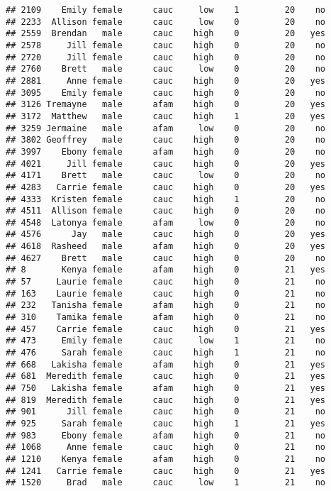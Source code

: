\documentclass[
]{article}
\begin{document}
\begin{verbatim}
## 2109    Emily female      cauc     low    1         20    no
## 2233  Allison female      cauc     low    0         20    no
## 2559  Brendan   male      cauc    high    0         20   yes
## 2578     Jill female      cauc    high    0         20    no
## 2720     Jill female      cauc    high    0         20    no
## 2760    Brett   male      cauc     low    0         20    no
## 2881     Anne female      cauc    high    0         20   yes
## 3095    Emily female      cauc    high    0         20    no
## 3126 Tremayne   male      afam    high    0         20   yes
## 3172  Matthew   male      cauc    high    1         20   yes
## 3259 Jermaine   male      afam     low    0         20    no
## 3802 Geoffrey   male      cauc    high    0         20    no
## 3997    Ebony female      afam    high    0         20    no
## 4021     Jill female      cauc    high    0         20   yes
## 4171    Brett   male      cauc     low    0         20    no
## 4283   Carrie female      cauc    high    0         20   yes
## 4333  Kristen female      cauc    high    1         20    no
## 4511  Allison female      cauc    high    0         20    no
## 4548  Latonya female      afam     low    0         20    no
## 4576      Jay   male      cauc    high    0         20   yes
## 4618  Rasheed   male      afam    high    0         20   yes
## 4627    Brett   male      cauc    high    0         20    no
## 8       Kenya female      afam    high    0         21   yes
## 57     Laurie female      cauc    high    0         21    no
## 163    Laurie female      cauc    high    0         21    no
## 232   Tanisha female      afam    high    0         21    no
## 310    Tamika female      afam    high    0         21    no
## 457    Carrie female      cauc    high    0         21   yes
## 473     Emily female      cauc     low    1         21    no
## 476     Sarah female      cauc    high    1         21    no
## 668   Lakisha female      afam    high    0         21   yes
## 681  Meredith female      cauc    high    0         21   yes
## 750   Lakisha female      afam    high    0         21   yes
## 819  Meredith female      cauc    high    0         21   yes
## 901      Jill female      cauc    high    0         21    no
## 925     Sarah female      cauc    high    1         21   yes
## 983     Ebony female      afam    high    0         21    no
## 1068     Anne female      cauc    high    0         21    no
## 1210    Kenya female      afam    high    0         21    no
## 1241   Carrie female      cauc    high    0         21   yes
## 1520     Brad   male      cauc     low    1         21    no

\end{verbatim}
\end{document}
